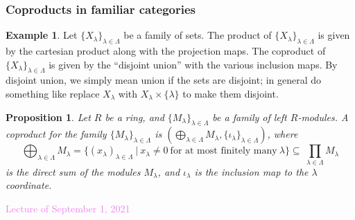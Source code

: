 \documentclass{amsart}[12pt]
\newcommand{\Hom}{\mathrm{Hom}}
\newcommand{\Sept}[1]{\textcolor{violet}{Lecture of September #1, 2021}}
\newcommand{\F}{\mathbb{F}}
\numberwithin{equation}{section}
\theoremstyle{plain} %
\newtheorem{prop}[equation]{Proposition}
\theoremstyle{definition}
\newtheorem{ex}[equation]{Example}
\theoremstyle{remark}
\newtheorem{rem}[equation]{Remark}
\newcommand{\sssec}[1]{\subsubsection{#1}}
\newcommand{\Fld}{\mathbf{Fld}}
\begin{document}



\sssec{Coproducts in familiar categories}



\begin{ex} Let $\{X_\lambda\}_{\lambda\in \Lambda}$ be a family of sets. The product of $\{X_\lambda\}_{\lambda\in \Lambda}$ is given by the cartesian product along with the projection maps. The coproduct of $\{X_\lambda\}_{\lambda\in \Lambda}$ is given by the ``disjoint union'' with the various inclusion maps. By disjoint union, we simply mean union if the sets are disjoint; in general do something like replace $X_\lambda$ with $X_\lambda \times \{\lambda\}$ to make them disjoint.
\end{ex}





\begin{prop} Let $R$ be a ring, and $\{M_\lambda\}_{\lambda\in \Lambda}$ be a family of left $R$-modules. A coproduct for the family $\{M_\lambda\}_{\lambda\in \Lambda}$ is  $\left(\bigoplus_{\lambda \in \Lambda} M_\lambda, \{\iota_\lambda\}_{\lambda\in \Lambda}\right)$, where \[\bigoplus_{\lambda \in \Lambda} M_\lambda=\{ (x_\lambda)_{\lambda\in \Lambda} \ | \ x_\lambda\neq 0 \ \text{for at most finitely many} \ \lambda\} \subseteq \ \prod_{\lambda \in \Lambda} M_\lambda\] is the direct sum of the modules $M_\lambda$, and $\iota_\lambda$ is the inclusion map to the $\lambda$ coordinate.
\end{prop}

\Sept{1}
\end{document}
